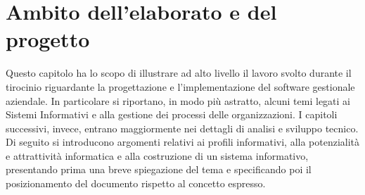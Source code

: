 \chapter{Ambito dell'elaborato e del progetto}
\label{cha:ambito}
Questo capitolo ha lo scopo di illustrare ad alto livello il lavoro svolto durante il tirocinio riguardante la progettazione e l'implementazione del software gestionale aziendale. In particolare si riportano, in modo più astratto, alcuni temi legati ai Sistemi Informativi \cite{SI} e alla gestione dei processi delle organizzazioni. I capitoli successivi, invece, entrano maggiormente nei dettagli di analisi e sviluppo tecnico.\newline
Di seguito si introducono argomenti relativi ai profili informativi, alla potenzialità e attrattività informatica e alla costruzione di un sistema informativo, presentando prima una breve spiegazione del tema e specificando poi il posizionamento del documento rispetto al concetto espresso.   

